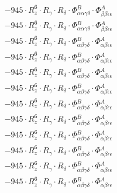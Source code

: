 \documentclass{article}
\begin{document}
\begin{subequations}
\begin{gather}
\begin{array}{c}
 \\[0.2em] 		 - 945 \cdot R_{z}^{6} \cdot R_{\gamma{}} \cdot R_{\delta{}} \cdot \Phi{}^{B}_{\alpha{}\alpha{}\gamma{}\delta{}} \cdot \Phi{}^{A}_{\beta{}\beta{}\epsilon{}\epsilon{}} 
 \\[0.2em] 		 - 945 \cdot R_{z}^{6} \cdot R_{\gamma{}} \cdot R_{\delta{}} \cdot \Phi{}^{B}_{\alpha{}\alpha{}\gamma{}\delta{}} \cdot \Phi{}^{A}_{\beta{}\beta{}\epsilon{}\epsilon{}} 
 \\[0.2em] 		 - 945 \cdot R_{z}^{6} \cdot R_{\gamma{}} \cdot R_{\delta{}} \cdot \Phi{}^{B}_{\alpha{}\beta{}\gamma{}\delta{}} \cdot \Phi{}^{A}_{\alpha{}\beta{}\epsilon{}\epsilon{}} 
 \\[0.2em] 		 - 945 \cdot R_{z}^{6} \cdot R_{\gamma{}} \cdot R_{\delta{}} \cdot \Phi{}^{B}_{\alpha{}\beta{}\gamma{}\delta{}} \cdot \Phi{}^{A}_{\alpha{}\beta{}\epsilon{}\epsilon{}} 
 \\[0.2em] 		 - 945 \cdot R_{z}^{6} \cdot R_{\gamma{}} \cdot R_{\delta{}} \cdot \Phi{}^{B}_{\alpha{}\beta{}\gamma{}\delta{}} \cdot \Phi{}^{A}_{\alpha{}\beta{}\epsilon{}\epsilon{}} 
 \\[0.2em] 		 - 945 \cdot R_{z}^{6} \cdot R_{\gamma{}} \cdot R_{\delta{}} \cdot \Phi{}^{B}_{\alpha{}\beta{}\gamma{}\delta{}} \cdot \Phi{}^{A}_{\alpha{}\beta{}\epsilon{}\epsilon{}} 
 \\[0.2em] 		 - 945 \cdot R_{z}^{6} \cdot R_{\gamma{}} \cdot R_{\delta{}} \cdot \Phi{}^{B}_{\alpha{}\beta{}\gamma{}\delta{}} \cdot \Phi{}^{A}_{\alpha{}\beta{}\epsilon{}\epsilon{}} 
 \\[0.2em] 		 - 945 \cdot R_{z}^{6} \cdot R_{\gamma{}} \cdot R_{\delta{}} \cdot \Phi{}^{B}_{\alpha{}\beta{}\gamma{}\delta{}} \cdot \Phi{}^{A}_{\alpha{}\beta{}\epsilon{}\epsilon{}} 
 \\[0.2em] 		 - 945 \cdot R_{z}^{6} \cdot R_{\gamma{}} \cdot R_{\delta{}} \cdot \Phi{}^{B}_{\alpha{}\beta{}\gamma{}\delta{}} \cdot \Phi{}^{A}_{\alpha{}\beta{}\epsilon{}\epsilon{}} 
 \\[0.2em] 		 - 945 \cdot R_{z}^{6} \cdot R_{\gamma{}} \cdot R_{\delta{}} \cdot \Phi{}^{B}_{\alpha{}\beta{}\gamma{}\delta{}} \cdot \Phi{}^{A}_{\alpha{}\beta{}\epsilon{}\epsilon{}} 
 \\[0.2em] 		 - 945 \cdot R_{z}^{6} \cdot R_{\gamma{}} \cdot R_{\delta{}} \cdot \Phi{}^{B}_{\alpha{}\beta{}\gamma{}\delta{}} \cdot \Phi{}^{A}_{\alpha{}\beta{}\epsilon{}\epsilon{}} 
 \\[0.2em] 		 - 945 \cdot R_{z}^{6} \cdot R_{\gamma{}} \cdot R_{\delta{}} \cdot \Phi{}^{B}_{\alpha{}\beta{}\gamma{}\delta{}} \cdot \Phi{}^{A}_{\alpha{}\beta{}\epsilon{}\epsilon{}} 

\end{array}
\end{gather}
\end{subequations}
\end{document}
